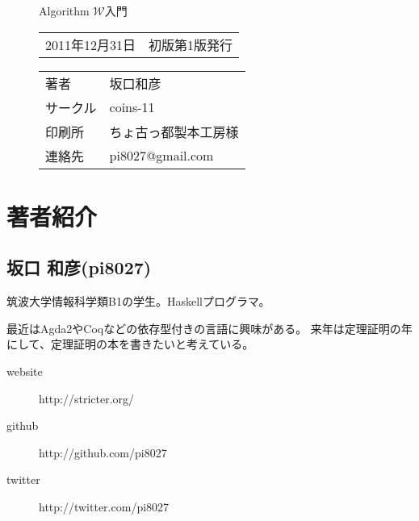
\begin{figure}[b]

{\LARGE Algorithm $\mathcal W$入門}

\hrulefill

\begin{tabular}{rl}
2011年12月31日 & 初版第1版発行
\end{tabular}

\vspace{1zh}

\begin{tabular}{ll}
著者     & 坂口和彦 \\
サークル & coins-11 \\
印刷所   & ちょ古っ都製本工房様 \\
連絡先   & pi8027@gmail.com \\
\end{tabular}

\hrulefill

\vspace{2zh}

\end{figure}

\section*{著者紹介}

\subsection*{坂口 和彦(pi8027)}

筑波大学情報科学類B1の学生。Haskellプログラマ。

最近はAgda2やCoqなどの依存型付きの言語に興味がある。
来年は定理証明の年にして、定理証明の本を書きたいと考えている。

\begin{description}
\item[website] http://stricter.org/
\item[github] http://github.com/pi8027
\item[twitter] http://twitter.com/pi8027
\end{description}

